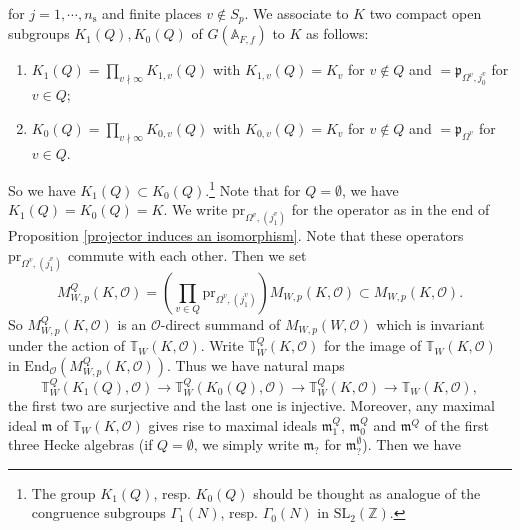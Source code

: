 \documentclass[12pt,oneside,reqno]{amsart}
\theoremstyle{plain}
\begin{document}
	for
	$j=1,\cdots,n_\mathrm{s}$
	and
	finite places $v\notin S_p$.
	We associate to $K$ two compact open subgroups
	$K_1(Q),K_0(Q)$ of
	$G(\mathbb{A}_{F,f})$
	to
	$K$ as follows:
	\begin{enumerate}
		\item 
		$K_1(Q)=\prod_{v\nmid\infty}K_{1,v}(Q)$
		with
		$K_{1,v}(Q)=K_v$
		for $v\notin Q$
		and
		$=\mathfrak{p}_{\Omega^v,j_0^v}$
		for $v\in Q$;
		
		
		\item 
		$K_0(Q)=\prod_{v\nmid\infty}
		K_{0,v}(Q)$
		with
		$K_{0,v}(Q)=K_v$
		for $v\notin Q$
		and
		$=\mathfrak{p}_{\Omega^v}$
		for
		$v\in Q$.
	\end{enumerate}
	So we have $K_1(Q)\subset K_0(Q)$.\footnote{The group $K_1(Q)$, resp. $K_0(Q)$ should be thought as analogue of the congruence subgroups $\Gamma_1(N)$, resp. $\Gamma_0(N)$ in $\mathrm{SL}_2(\mathbb{Z})$.}
	Note that for $Q=\emptyset$, we have $K_1(Q)=K_0(Q)=K$.
	We write
	$\mathrm{pr}_{\Omega^v,(j_1^v)}$
	for the operator as in the end of
	Proposition
	\ref{projector induces an isomorphism}. Note that these operators $\mathrm{pr}_{\Omega^v,(j_1^v)}$ commute with each other.
	Then we set
	\[
	M_{W,p}^Q(K,\mathcal{O})
	=
	\left(
	\prod_{v\in Q}
	\mathrm{pr}_{\Omega^v,(j_1^v)}
	\right)
	M_{W,p}(K,\mathcal{O})
	\subset
	M_{W,p}(K,\mathcal{O}).
	\]
	So
	$M^Q_{W,p}(K,\mathcal{O})$
	is an $\mathcal{O}$-direct summand of
	$M_{W,p}(W,\mathcal{O})$
	which is invariant under the action of
	$\mathbb{T}_W(K,\mathcal{O})$.
	Write
	$\mathbb{T}_W^{Q}(K,\mathcal{O})$
	for the image of
	$\mathbb{T}_W(K,\mathcal{O})$
	in
	$\mathrm{End}_\mathcal{O}
	(M_{W,p}^Q(K,\mathcal{O}))$.
	Thus we have natural maps
	\begin{equation}\label{morphisms between Hecke algebras}
		\mathbb{T}_W^{Q}(K_1(Q),\mathcal{O})
		\rightarrow
		\mathbb{T}_W^{Q}(K_0(Q),\mathcal{O})
		\rightarrow
		\mathbb{T}_W^{Q}(K,\mathcal{O})
		\rightarrow
		\mathbb{T}_W(K,\mathcal{O}),
	\end{equation}
	the first two are surjective and the last one is injective. Moreover, any maximal ideal $\mathfrak{m}$ of
	$\mathbb{T}_W(K,\mathcal{O})$
	gives rise to maximal ideals
	$\mathfrak{m}_1^Q$,
	$\mathfrak{m}_0^Q$ and $\mathfrak{m}^Q$
	of the first three Hecke algebras (if $Q=\emptyset$, we simply write $\mathfrak{m}_?$ for $\mathfrak{m}_?^\emptyset$).
	Then  we have
	
\end{document}
